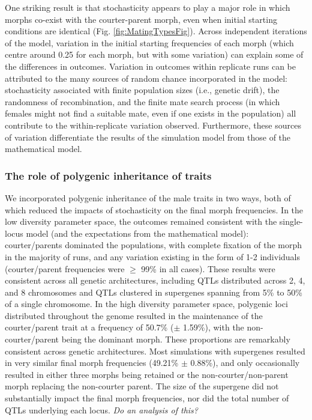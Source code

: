 \documentclass[
  11pt,
]{article}
\begin{document}
One striking result is that stochasticity appears to play a major role
in which morphs co-exist with the courter-parent morph, even when
initial starting conditions are identical (Fig.
\ref{fig:MatingTypesFig}). Across independent iterations of the model,
variation in the initial starting frequencies of each morph (which
centre around 0.25 for each morph, but with some variation) can explain
some of the differences in outcomes. Variation in outcomes within
replicate runs can be attributed to the many sources of random chance
incorporated in the model: stochasticity associated with finite
population sizes (i.e., genetic drift), the randomness of recombination,
and the finite mate search process (in which females might not find a
suitable mate, even if one exists in the population) all contribute to
the within-replicate variation observed. Furthermore, these sources of
variation differentiate the results of the simulation model from those
of the mathematical model.

\hypertarget{the-role-of-polygenic-inheritance-of-traits}{%
\subsubsection{The role of polygenic inheritance of traits}\label{the-role-of-polygenic-inheritance-of-traits}}

We incorporated polygenic inheritance of the male traits in two ways,
both of which reduced the impacts of stochasticity on the final morph
frequencies. In the low diversity parameter space, the outcomes remained
consistent with the single-locus model (and the expectations from the
mathematical model): courter/parents dominated the populations, with
complete fixation of the morph in the majority of runs, and any
variation existing in the form of 1-2 individuals (courter/parent
frequencies were \(\ge\) 99\% in all cases). These results were consistent
across all genetic architectures, including QTLs distributed across 2,
4, and 8 chromosomes and QTLs clustered in supergenes spanning from 5\%
to 50\% of a single chromosome. In the high diversity parameter space,
polygenic loci distributed throughout the genome resulted in the
maintenance of the courter/parent trait at a frequency of
50.7\%
(\(\pm\)
1.59\%),
with the non-courter/parent being the dominant morph. These proportions
are remarkably consistent across genetic architectures. Most simulations
with supergenes resulted in very similar final morph frequencies
(49.21\%
\(\pm\)
0.88\%),
and only occasionally resulted in either three morphs being retained or
the non-courter/non-parent morph replacing the non-courter parent. The
size of the supergene did not substantially impact the final morph
frequencies, nor did the total number of QTLs underlying each locus. \emph{Do
an analysis of this?}
\end{document}
